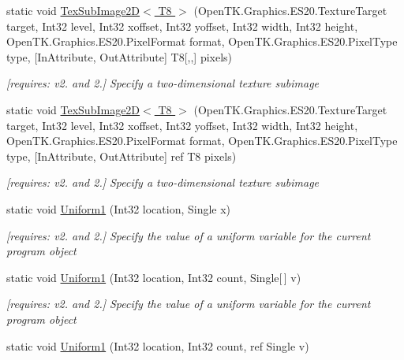\begin{DoxyCompactItemize}
static void \hyperlink{class_open_t_k_1_1_graphics_1_1_e_s20_1_1_g_l_ad4b4eadb6bbf7488edadd5d550a53db7}{Tex\-Sub\-Image2\-D$<$ T8 $>$} (Open\-T\-K.\-Graphics.\-E\-S20.\-Texture\-Target target, Int32 level, Int32 xoffset, Int32 yoffset, Int32 width, Int32 height, Open\-T\-K.\-Graphics.\-E\-S20.\-Pixel\-Format format, Open\-T\-K.\-Graphics.\-E\-S20.\-Pixel\-Type type, \mbox{[}In\-Attribute, Out\-Attribute\mbox{]} T8\mbox{[},,\mbox{]} pixels)
\begin{DoxyCompactList}\small\item\em \mbox{[}requires\-: v2. and 2.\mbox{]} Specify a two-\/dimensional texture subimage \end{DoxyCompactList}\item 
static void \hyperlink{class_open_t_k_1_1_graphics_1_1_e_s20_1_1_g_l_a393435bb365a85c1292cba3a102abf6d}{Tex\-Sub\-Image2\-D$<$ T8 $>$} (Open\-T\-K.\-Graphics.\-E\-S20.\-Texture\-Target target, Int32 level, Int32 xoffset, Int32 yoffset, Int32 width, Int32 height, Open\-T\-K.\-Graphics.\-E\-S20.\-Pixel\-Format format, Open\-T\-K.\-Graphics.\-E\-S20.\-Pixel\-Type type, \mbox{[}In\-Attribute, Out\-Attribute\mbox{]} ref T8 pixels)
\begin{DoxyCompactList}\small\item\em \mbox{[}requires\-: v2. and 2.\mbox{]} Specify a two-\/dimensional texture subimage \end{DoxyCompactList}\item 
static void \hyperlink{class_open_t_k_1_1_graphics_1_1_e_s20_1_1_g_l_acfc2fd178c490fd1515f5e219c8f18f2}{Uniform1} (Int32 location, Single x)
\begin{DoxyCompactList}\small\item\em \mbox{[}requires\-: v2. and 2.\mbox{]} Specify the value of a uniform variable for the current program object \end{DoxyCompactList}\item 
static void \hyperlink{class_open_t_k_1_1_graphics_1_1_e_s20_1_1_g_l_a3d61955c83f0da1de043f083ce5a8069}{Uniform1} (Int32 location, Int32 count, Single\mbox{[}$\,$\mbox{]} v)
\begin{DoxyCompactList}\small\item\em \mbox{[}requires\-: v2. and 2.\mbox{]} Specify the value of a uniform variable for the current program object \end{DoxyCompactList}\item 
static void \hyperlink{class_open_t_k_1_1_graphics_1_1_e_s20_1_1_g_l_a24ff8d52007ebb9fd8b5c15c8975605b}{Uniform1} (Int32 location, Int32 count, ref Single v)

\end{DoxyCompactItemize}
